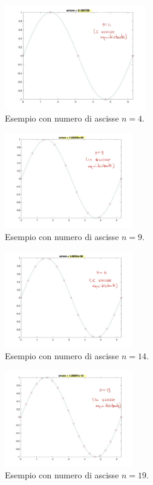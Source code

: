 \begin{figure}%
\centering
\includegraphics[width=0.55\textwidth]{immagini/sin(n=4).jpg}
\caption{Esempio con numero di ascisse $n=4$.}\label{fig:approxErrIntepolaz4}
\end{figure}

\begin{figure}%
\centering
\includegraphics[width=0.5\textwidth]{immagini/sin(n=9).jpg}
\caption{Esempio con numero di ascisse $n=9$.}\label{fig:approxErrIntepolaz9}
\end{figure}

\begin{figure}%
\centering
\includegraphics[width=0.5\textwidth]{immagini/sin(n=14).jpg}
\caption{Esempio con numero di ascisse $n=14$.}\label{fig:approxErrIntepolaz14}
\end{figure}

\begin{figure}%
\centering
\includegraphics[width=0.5\textwidth]{immagini/sin(n=19).jpg}
\caption{Esempio con numero di ascisse $n=19$.}\label{fig:approxErrIntepolaz19}
\end{figure}

